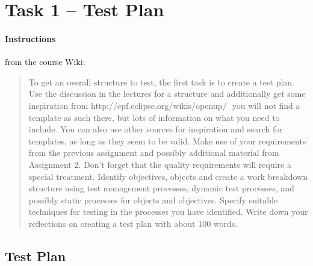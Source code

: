 %
%
%
%


\section{Task 1 -- Test Plan}

\paragraph{Instructions}\label{task-1-instructions}
from the course Wiki\cite{1dv600:lab3:instructions}:

\begin{quote}
  To get an overall structure to test, the first task is to create a test plan.
  Use the discussion in the lectures for a structure and additionally get some
  inspiration from http://epf.eclipse.org/wikis/openup/ ­­ you will not find a
  template as such there, but lots of information on what you need to include.
  You can also use other sources for inspiration and search for templates, as
  long as they seem to be valid. Make use of your requirements from the
  previous assignment and possibly additional material from Assignment 2. Don’t
  forget that the quality requirements will require a special treatment.
  Identify objectives, objects and create a work breakdown structure using test
  management processes, dynamic test processes, and possibly static processes
  for objects and objectives. Specify suitable techniques for testing in the
  processes you have identified. Write down your reflections on creating a test
  plan with about 100 words.
\end{quote}



\subsection{Test Plan}\label{task-1a}

